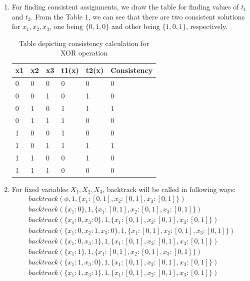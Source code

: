 \documentclass[12pt]{article}
\begin{document}
\begin{enumerate}[label=(\alph*)]
\begin{enumerate}[label=\roman*.]
  \item For finding consistent assignments, we draw the table for finding values of $t_1$ and $t_2$. From the Table 1, we can see that there are two consistent solutions for $x_1, x_2, x_3$, one being $\{0, 1, 0 \}$ and other being $\{ 1, 0, 1\}$, respectively.
  \begin{table}
\centering
\caption{Table depicting consistency calculation for XOR operation}
\begin{tabular}{|l|l|l|l|l|l|} 
\hline
x1 & x2 & x3 & t1(x) & t2(x) & \textbf{Consistency}  \\ 
\hline
0  & 0  & 0  & 0       & 0       & 0                     \\ 
\hline
0  & 0  & 1  & 0       & 1       & 0                     \\ 
\hline
0  & 1  & 0  & 1       & 1       & 1                     \\ 
\hline
0  & 1  & 1  & 1       & 0       & 0                     \\ 
\hline
1  & 0  & 0  & 1       & 0       & 0                     \\ 
\hline
1  & 0  & 1  & 1       & 1       & 1                     \\ 
\hline
1  & 1  & 0  & 0       & 1       & 0                     \\ 
\hline
1  & 1  & 1  & 0       & 0       & 0                     \\
\hline
\end{tabular}
\end{table}
  \item For fixed variables $X_1, X_2, X_3$, backtrack will be called in following ways:
  \begin{align*}
  backtrack(\phi, 1, \{x_1: [0, 1], x_2: [0, 1], x_3: [0,1]\}) \\
  backtrack(\{x_1: 0\}, 1, \{x_1: [0, 1], x_2: [0, 1], x_3: [0,1]\}) \\
  backtrack(\{x_1: 0, x_3: 0\}, 1, \{x_1: [0, 1], x_2: [0, 1], x_3: [0,1]\}) \\
  backtrack(\{x_1: 0, x_2: 1, x_3: 0\}, 1, \{x_1: [0, 1], x_2: [0, 1], x_3: [0,1]\}) \\
  backtrack(\{x_1: 0, x_3: 1\}, 1, \{x_1: [0, 1], x_2: [0, 1], x_3: [0,1]\}) \\
  backtrack(\{x_1: 1\}, 1, \{x_1: [0, 1], x_2: [0, 1], x_3: [0,1]\}) \\
  backtrack(\{x_1: 1, x_3: 0\}, 1, \{x_1: [0, 1], x_2: [0, 1], x_3: [0,1]\}) \\
  backtrack(\{x_1: 1, x_3: 1\}, 1, \{x_1: [0, 1], x_2: [0, 1], x_3: [0,1]\}) \\

\end{align*}
\end{enumerate}
\end{enumerate}
\end{document}
